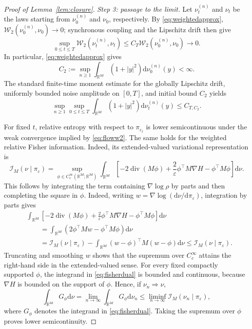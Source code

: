 \documentclass[11pt]{article}
\theoremstyle{definition}
\newcommand{\R}{\mathbb R}
\newcommand{\dd}{\mathrm d}
\newcommand{\cI}{\mathcal I}
\newcommand{\eps}{\varepsilon}
\begin{document}
\begin{proof}[Proof of Lemma~\ref{lem:closure}]
\smallskip
\noindent\emph{Step 3: passage to the limit.}
Let $\nu_t^{(n)}$ and $\nu_t$ be the laws starting from
$\nu_0^{(n)}$ and $\nu_0$, respectively. By \eqref{eq:weightedapprox},
$\mathcal W_2\left(\nu_0^{(n)},\nu_0\right)\to0$; synchronous coupling and the Lipschitz drift
then give
\begin{equation}\label{eq:floww2}
 \sup_{0\leq t\leq T}\mathcal W_2\left(\nu_t^{(n)},\nu_t\right)
 \leq C_T\mathcal W_2\left(\nu_0^{(n)},\nu_0\right)\longrightarrow0.
\end{equation}
In particular, \eqref{eq:weightedapprox} gives
\[
 C_2:=\sup_{n\geq1}\int_{\R^{3d}}
 \left(1+|y|^2\right)\dd\nu_0^{(n)}(y)<\infty.
\]
The standard finite-time moment estimate for the globally Lipschitz drift,
uniformly bounded noise amplitude on $[0,T]$, and initial bound $C_2$ yields
\begin{equation}\label{eq:regularizedmoments}
 \sup_{n\geq1}\sup_{0\leq t\leq T}
 \int_{\R^{3d}}\left(1+|y|^2\right)\dd\nu_t^{(n)}(y)\leq C_{T,C_2}.
\end{equation}

For fixed $t$, relative entropy with respect to $\pi_{\eps_t}$ is lower
semicontinuous under the weak convergence implied by \eqref{eq:floww2}. The
same holds for the weighted relative Fisher information. Indeed, its
extended-valued variational representation is
\begin{equation}\label{eq:fisherdual}
 \cI_M(\nu\mid\pi_\eps)
 =\sup_{\phi\in C_c^\infty(\R^{3d};\R^{3d})}
 \int_{\R^{3d}}\left[-2\operatorname{div}(M\phi)
 +\frac{2}{\eps}\phi^\top M\nabla H-\phi^\top M\phi\right]\dd\nu.
\end{equation}
This follows by integrating the term containing $\nabla\log\rho$ by parts and
then completing the square in $\phi$.
Indeed, writing $w=\nabla\log(\dd\nu/\dd\pi_\eps)$, integration by parts gives
\begin{align*}
 &\int_{\R^{3d}}\left[-2\operatorname{div}(M\phi)
 +\frac{2}{\eps}\phi^\top M\nabla H-\phi^\top M\phi\right]\dd\nu\\
 &\qquad=\int_{\R^{3d}}
       \left(2\phi^\top Mw-\phi^\top M\phi\right)\dd\nu\\
 &\qquad=\cI_M(\nu\mid\pi_\eps)
       -\int_{\R^{3d}}(w-\phi)^\top M(w-\phi)\dd\nu
 \leq\cI_M(\nu\mid\pi_\eps).
\end{align*}
Truncating and smoothing $w$ shows that the supremum over
$C_c^\infty$ attains the right-hand side in the extended-valued sense. For
every fixed compactly supported $\phi$, the integrand in
\eqref{eq:fisherdual} is bounded and continuous, because $\nabla H$ is bounded
on the support of $\phi$. Hence, if $\nu_n\Rightarrow\nu$,
\[
 \int_{\R^{3d}} G_\phi\dd\nu=\lim_{n\to\infty}\int_{\R^{3d}} G_\phi\dd\nu_n
 \leq\liminf_{n\to\infty}\cI_M(\nu_n\mid\pi_\eps),
\]
where $G_\phi$ denotes the integrand in \eqref{eq:fisherdual}. Taking the
supremum over $\phi$ proves lower semicontinuity.


\end{proof}
\end{document}
